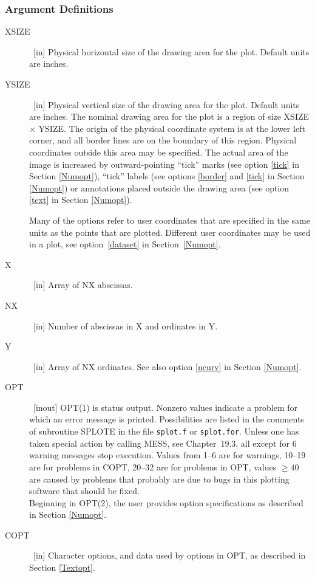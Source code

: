 \documentclass[twoside]{MATH77}
\begin{document}
\subsubsection{Argument Definitions\label{Argdef}}
\begin{description}
\item[XSIZE] \ [in] Physical horizontal size of the drawing area for the plot.
  Default units are inches.
\item[YSIZE] \ [in] Physical vertical size of the drawing area for the plot.
  Default units are inches.  The nominal drawing area for the plot is a
  region of size XSIZE $\times$ YSIZE.  The origin of the physical
  coordinate system is at the lower left corner, and all border lines
  are on the boundary of this region. Physical coordinates outside this
  area may be specified.  The actual area of the image is increased by
  outward-pointing ``tick'' marks (see option \ref{tick} in Section
  \ref{Numopt}), ``tick'' labels (see options \ref{border} and \ref{tick}
  in Section \ref{Numopt}) or annotations placed outside the drawing area
  (see option \ref{text} in Section \ref{Numopt}).

  Many of the options refer to user coordinates that are specified in
  the same units as the points that are plotted.  Different user
  coordinates may be used in a plot, see option~\ref{dataset} in
  Section~\ref{Numopt}.
\item[X]     \ [in] Array of NX abscissas.
\item[NX]    \ [in] Number of abscissas in X and ordinates in Y.
\item[Y]     \ [in] Array of NX ordinates.
  See also option \ref{ncurv} in Section \ref{Numopt}.
\item[OPT]   \ [inout] OPT(1) is status output.  Nonzero values indicate
  a problem for which an error message is printed. Possibilities are
    listed in the comments of subroutine SPLOTE in the file {\tt splot.f}
    or {\tt splot.for}.  Unless one has taken special action by calling
    MESS, see Chapter~19.3, all except for 6 warning messages stop
    execution.  Values from 1--6 are for warnings, 10--19 are for problems
    in COPT, 20--32 are for problems in OPT, values $\geq 40$ are caused
    by problems that probably are due to bugs in this plotting software
    that should be fixed.\\
  Beginning in OPT(2), the user provides option specifications as described
  in Section \ref{Numopt}.
\item[COPT]  \ [in] Character options, and data used by options in OPT, as
  described in Section \ref{Textopt}.
\end{description}
\end{document}
